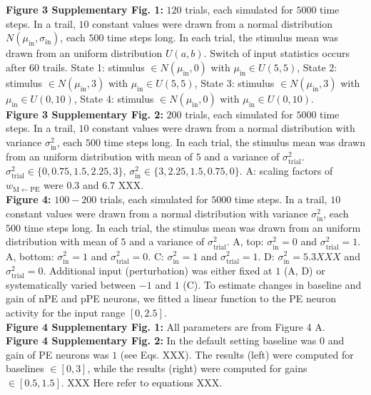 \documentclass[10pt,a4paper,draft]{article}
\begin{document}
%
\textbf{Figure 3 Supplementary Fig. 1:}  $120$ trials, each simulated for $5000$ time steps. In a trail, $10$ constant values were drawn from a normal distribution $N(\mu_\mathrm{in}, \sigma_\mathrm{in})$, each $500$ time steps long. In each trial, the stimulus mean was drawn from an uniform distribution $U(a, b)$. Switch of input statistics occurs after 60 trails. State 1: stimulus $\in N(\mu_\mathrm{in}, 0)$ with $\mu_\mathrm{in} \in U(5,5)$, State 2:  stimulus $\in N(\mu_\mathrm{in}, 3)$ with $\mu_\mathrm{in} \in U(5,5)$, State 3: stimulus $\in N(\mu_\mathrm{in}, 3)$ with $\mu_\mathrm{in} \in U(0,10)$, State 4: stimulus $\in N(\mu_\mathrm{in}, 0)$ with $\mu_\mathrm{in} \in U(0,10)$.\\
%
\textbf{Figure 3 Supplementary Fig. 2:} $200$ trials, each simulated for $5000$ time steps. In a trail, $10$ constant values were drawn from a normal distribution with variance $\sigma^2_\mathrm{in}$, each $500$ time steps long. In each trial, the stimulus mean was drawn from an uniform distribution with mean of $5$ and a variance of $\sigma^2_\mathrm{trial}$. $\sigma^2_\mathrm{trial} \in \lbrace0, 0.75, 1.5, 2.25, 3\rbrace$, $\sigma^2_\mathrm{in} \in \lbrace 3, 2.25, 1.5,0.75, 0\rbrace$. A: scaling factors of $w_\mathrm{M\leftarrow PE}$ were 0.3 and 6.7 XXX.\\
%
\textbf{Figure 4:} $100-200$ trials, each simulated for $5000$ time steps. In a trail, $10$ constant values were drawn from a normal distribution with variance $\sigma^2_\mathrm{in}$, each $500$ time steps long. In each trial, the stimulus mean was drawn from an uniform distribution with mean of $5$ and a variance of $\sigma^2_\mathrm{trial}$. A, top: $\sigma^2_\mathrm{in} = 0$ and $\sigma^2_\mathrm{trial} = 1$. A, bottom: $\sigma^2_\mathrm{in} = 1$ and $\sigma^2_\mathrm{trial} = 0$. C: $\sigma^2_\mathrm{in} = 1$ and $\sigma^2_\mathrm{trial} = 1$. D: $\sigma^2_\mathrm{in} = 5.3 XXX$ and $\sigma^2_\mathrm{trial} = 0$. Additional input (perturbation) was either fixed at $1$ (A, D) or systematically varied between $-1$ and $1$ (C). To estimate changes in baseline and gain of nPE and pPE neurons, we fitted a linear function to the PE neuron activity for the input range $[0, 2.5]$.\\
%
\textbf{Figure 4 Supplementary Fig. 1:} All parameters are from Figure 4 A.\\
%
\textbf{Figure 4 Supplementary Fig. 2:} In the default setting baseline was $0$ and gain of PE neurons was $1$ (see Eqs. XXX). The results (left) were computed for baselines $\in [0, 3]$, while the results (right) were computed for gains $\in [0.5, 1.5]$. XXX Here refer to equations XXX. \\
\end{document}
